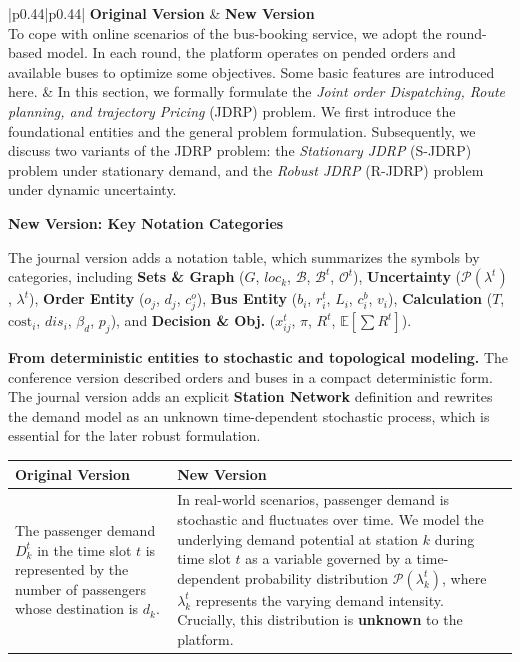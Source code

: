 \documentclass[11pt, a4paper]{article}
\begin{document}
\begin{itemize}
    \begin{tabular}{|p{0.44\textwidth}|p{0.44\textwidth}|}
        \hline
        \textbf{Original Version} & \textbf{New Version}\\
        \hline
        To cope with online scenarios of the bus-booking service, we adopt the round-based model. In each round, the platform operates on pended orders and available buses to optimize some objectives. Some basic features are introduced here. &
        In this section, we formally formulate the \textit{Joint order Dispatching, Route planning, and trajectory Pricing} (JDRP) problem. We first introduce the foundational entities and the general problem formulation. Subsequently, we discuss two variants of the JDRP problem: the \textit{Stationary JDRP} (S-JDRP)~\cite{ref:odrp} problem under stationary demand, and the \textit{Robust JDRP} (R-JDRP) problem under dynamic uncertainty.\\
        \hline
    \end{tabular}

    \begin{boxedminipage}[htbp]{\linewidth}
    \vspace{2mm}
    \noindent \textbf{New Version: Key Notation Categories}
    
    The journal version adds a notation table, which summarizes the symbols by categories, including \textbf{Sets \& Graph} ($G$, $loc_k$, $\mathcal{B}$, $\mathcal{B}^t$, $\mathcal{O}^t$), \textbf{Uncertainty} ($\mathcal{P}(\lambda^t)$, $\lambda^t$), \textbf{Order Entity} ($o_j$, $d_j$, $c^o_j$), \textbf{Bus Entity} ($b_i$, $r_i^t$, $L_i$, $c^b_i$, $v_i$), \textbf{Calculation} ($T$, $\text{cost}_i$, $dis_i$, $\beta_d$, $p_j$), and \textbf{Decision \& Obj.} ($x_{ij}^t$, $\pi$, $R^t$, $\mathbb{E}[\sum R^t]$).
    \vspace{2mm}
    \end{boxedminipage}

    \textbf{From deterministic entities to stochastic and topological modeling.} The conference version described orders and buses in a compact deterministic form. The journal version adds an explicit \textbf{Station Network} definition and rewrites the demand model as an unknown time-dependent stochastic process, which is essential for the later robust formulation.

    \begin{tabular}{|p{}|p{}|}
        \hline
        \textbf{Original Version} & \textbf{New Version}\\
        \hline
        The passenger demand $D_k^t$ in the time slot $t$ is represented by the number of passengers whose destination is $d_k$. &
        In real-world scenarios, passenger demand is stochastic and fluctuates over time. We model the underlying demand potential at station $k$ during time slot $t$ as a variable governed by a time-dependent probability distribution $\mathcal{P}(\lambda^t_k)$, where $\lambda^t_k$ represents the varying demand intensity. Crucially, this distribution is \textbf{unknown} to the platform.\\
        \hline
    \end{tabular}


\end{itemize}
\end{document}
